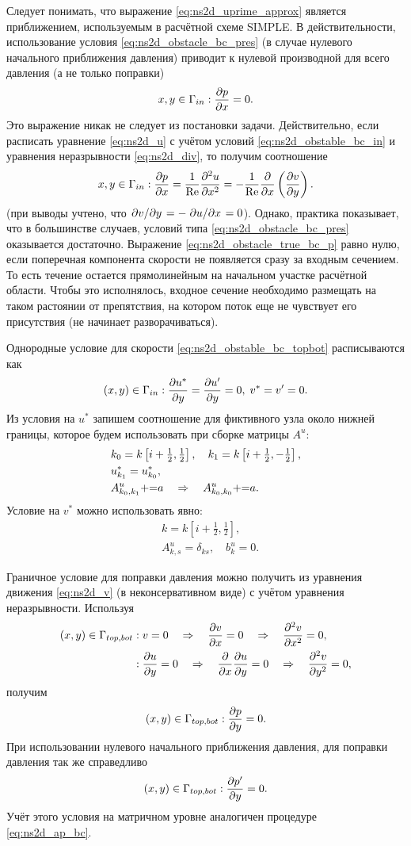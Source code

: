 Следует понимать, что выражение \cref{eq:ns2d_uprime_approx}
является приближением, используемым в расчётной схеме SIMPLE.
В действительности, использование условия \cref{eq:ns2d_obstacle_bc_pres} (в случае нулевого начального приближения давления)
приводит к нулевой производной для всего давления (а не только поправки)
$$
x,y\in\Gamma_{in}: \frac{\partial p}{\partial x}=0.
$$
Это выражение никак не следует из постановки задачи.
Действительно, если расписать уравнение \cref{eq:ns2d_u} с учётом условий \cref{eq:ns2d_obstable_bc_in}
и уравнения неразрывности \cref{eq:ns2d_div}, то получим соотношение
\begin{equation}
\label{eq:ns2d_obstacle_true_bc_p}
x,y\in\Gamma_{in}: \frac{\partial p}{\partial x} = \frac{1}{\mathrm{Re}}\frac{\partial^2 u}{\partial x^2} = -\frac1{\mathrm{Re}}\frac{\partial }{\partial x}\left(\frac{\partial v}{\partial y}\right).
\end{equation}
(при выводы учтено, что $\left.\partial v\middle/\partial y\right. = -\left.\partial u\middle/\partial x\right. = 0$).
Однако, практика показывает, что в большинстве случаев, условий типа \cref{eq:ns2d_obstacle_bc_pres}
оказывается достаточно. Выражение \cref{eq:ns2d_obstacle_true_bc_p} равно нулю,
если поперечная компонента скорости не появляется сразу за входным сечением. То есть
течение остается прямолинейным на начальном участке расчётной области.
Чтобы это исполнялось, входное сечение необходимо размещать
на таком растоянии от препятствия, на котором поток еще не чувствует его присутствия (не начинает разворачиваться).

Однородные условие для скорости \cref{eq:ns2d_obstable_bc_topbot} расписываются
как
$$
(x,y) \in \Gamma_{in}: \frac{\partial u^*}{\partial y} = \frac{\partial u'}{\partial y} = 0, \; v^* = v' = 0.
$$
Из условия на $u^*$ запишем соотношение для фиктивного узла около нижней границы, которое будем использовать
при сборке матрицы $A^u$:
\begin{align*}
&k_0 = k\left[i+\tfrac12, \tfrac12\right], \quad k_1 = k\left[i+\tfrac12, -\tfrac12\right], \\
&u^*_{k_1} = u^*_{k_0}, \\
&A^u_{k_0, k_1} {{+}{=}} a \quad\Rightarrow\quad A^u_{k_0, k_0} {{+}{=}} a.
\end{align*}
Условие на $v^*$ можно использовать явно:
\begin{align*}
&k = k\left[i+\tfrac12, \tfrac12\right], \\
&A^u_{k,s} = \delta_{ks}, \quad b^u_k = 0.
\end{align*}

Граничное условие для поправки давления
можно получить из уравнения движения \cref{eq:ns2d_v} (в неконсервативном виде) с учётом уравнения неразрывности.
Используя
\begin{align*}
&(x,y) \in \Gamma_{top,bot}:
	v = 0 \hence \dfr{v}{x} = 0 \hence \dfrq{v}{x} = 0,\\
&\phantom{(x,y) \in \Gamma_{top,bot}}:
	\dfr{u}{y} = 0 \hence \dfr{}{x}\dfr{u}{y} = 0 \hence \dfrq{v}{y} = 0,\\
\end{align*}
получим
$$
(x,y) \in \Gamma_{top,bot}: \frac{\partial p}{\partial y} = 0.
$$
При использовании нулевого начального приближения давления, для поправки давления так же справедливо
$$
(x,y) \in \Gamma_{top,bot}: \frac{\partial p'}{\partial y} = 0.
$$
Учёт этого условия на матричном уровне аналогичен процедуре \cref{eq:ns2d_ap_bc}.

